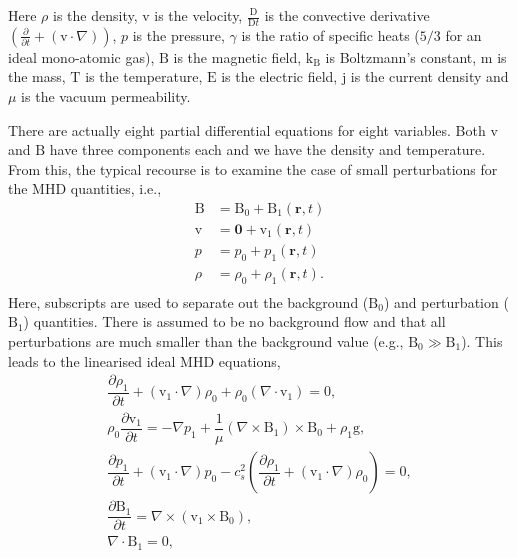     Here $\rho$ is the density, $\boldsymbol{\mathrm{v}}$ is the velocity, $\frac{\mathrm{D}}{\mathrm{D}t}$ is the convective derivative $\left(\frac{\partial}{\partial t} + (\boldsymbol{\mathrm{v}}\cdot\nabla)\right)$, $p$ is the pressure, $\gamma$ is the ratio of specific heats ($5/3$ for an ideal mono-atomic gas), $\boldsymbol{\mathrm{B}}$ is the magnetic field, $\mathrm{k_B}$ is Boltzmann's constant, $\mathrm{m}$ is the mass, $\mathrm{T}$ is the temperature, $\boldsymbol{\mathrm{E}}$ is the electric field, $\boldsymbol{\mathrm{j}}$ is the current density and $\mu$ is the vacuum permeability. 

    There are actually eight partial differential equations for eight variables.
    Both $\boldsymbol{\mathrm{v}}$ and $\boldsymbol{\mathrm{B}}$ have three components each and we have the density and temperature.
    From this, the typical recourse is to examine the case of small perturbations for the MHD quantities, i.e.,
    \begin{align*}                                                         
        \boldsymbol{\mathrm{B}} &= \boldsymbol{\mathrm{B}}_0 + \boldsymbol{\mathrm{B}}_1(\boldsymbol{r},t)\\               
        \boldsymbol{\mathrm{v}} &= \boldsymbol{0} + \boldsymbol{\mathrm{v}}_1(\boldsymbol{r},t)\\               
        p &= p_0 + {p_1}(\boldsymbol{r},t)\\               
        \rho &= \rho_0 + {\rho_1}(\boldsymbol{r},t).\\              
    \end{align*}
    Here, subscripts are used to separate out the background ($\mathrm{B}_0$) and perturbation ($\mathrm{B}_1$) quantities.
    There is assumed to be no background flow and that all perturbations are much smaller than the background value (e.g., $\mathrm{B}_0 \gg \mathrm{B}_1$).      
    This leads to the linearised ideal MHD equations,
    \begin{align}                                                         
    \dfrac{\partial \rho_1 }{\partial t} + (\boldsymbol{\mathrm{v}}_1 \cdot \nabla)\rho_0 + \rho_0 (\nabla \cdot \boldsymbol{\mathrm{v}}_1) =       
    0,\tag{Mass Conservation}\\                                  
    \rho_0 \dfrac{\partial \boldsymbol{\mathrm{v}}_1}{\partial t} =
    -\nabla p_1 + \dfrac{1}{\mu}(\nabla \times \boldsymbol{\mathrm{B}}_1) \times \boldsymbol{\mathrm{B}}_0 + \rho_1 \boldsymbol{\mathrm{g}},\tag{Equation of Motion}\\
    \dfrac{\partial p_1}{\partial t} + (\boldsymbol{\mathrm{v}}_1 \cdot \nabla)p_0 - c_s^2 \left( \dfrac{\partial \rho_1}{\partial t} + (\boldsymbol{\mathrm{v}}_1 \cdot \nabla)\rho_0 \right) = 0,\tag{Energy Equation}\\       
    \dfrac{\partial \boldsymbol{\mathrm{B}}_1}{\partial t} = \nabla \times (\boldsymbol{\mathrm{v}}_1 \times \boldsymbol{\mathrm{B}}_0),\tag{Induction Equation}\\
    \nabla \cdot \boldsymbol{\mathrm{B}}_1 = 0, \tag{Solenoid Equation}               
    \end{align}
